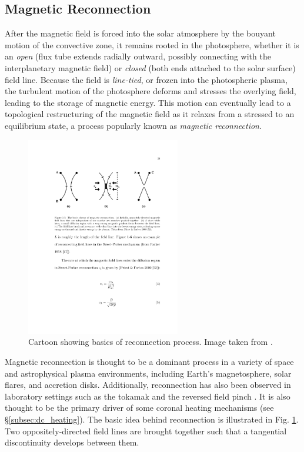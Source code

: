 \subsection{Magnetic Reconnection}
\label{subsec:magnetic_reconnection}
\par After the magnetic field is forced into the solar atmosphere by the bouyant motion of the convective zone, it remains rooted in the photosphere, whether it is an \textit{open} (flux tube extends radially outward, possibly connecting with the interplanetary magnetic field) or \textit{closed} (both ends attached to the solar surface) field line. Because the field is \textit{line-tied}, or frozen into the photospheric plasma, the turbulent motion of the photosphere deforms and stresses the overlying field, leading to the storage of magnetic energy. This motion can eventually lead to a topological restructuring of the magnetic field as it relaxes from a stressed to an equilibrium state, a process popularly known as \textit{magnetic reconnection}.
%
\begin{figure}
	\centering
	\includegraphics[width=0.6\textwidth]{figures/reconnection_cartoon.pdf}
	\caption{Cartoon showing basics of reconnection process. Image taken from \citet{priest_magnetic_2000}.}
	\label{fig:reconnection}
\end{figure}
%
\par Magnetic reconnection is thought to be a dominant process in a variety of space and astrophysical plasma environments, including Earth's magnetosphere, solar flares, and accretion disks. Additionally, reconnection has also been observed in laboratory settings such as the tokamak and the reversed field pinch \citep{priest_magnetic_2000}. It is also thought to be the primary driver of some coronal heating mechanisms (see \S\ref{subsec:dc_heating}). The basic idea behind reconnection is illustrated in Fig. \ref{fig:reconnection}. Two oppositely-directed field lines are brought together such that a tangential discontinuity develops between them. 
